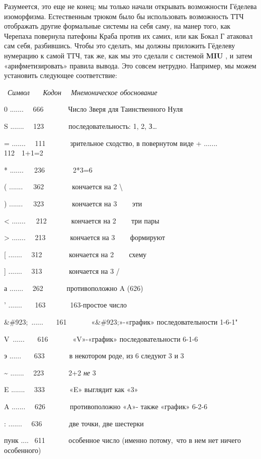 \documentclass[../main.tex]{subfiles}
\begin{document}
Разумеется, это еще не конец; мы только начали открывать возможности Гёделева изоморфизма. Естественным трюком было бы использовать возможность ТТЧ отображать другие формальные системы на себя саму, на манер того, как Черепаха повернула патефоны Краба против их самих, или как Бокал Г атаковал сам себя, разбившись. Чтобы это сделать, мы должны приложить Гёделеву нумерацию к самой ТТЧ, так же, как мы это сделали с системой \textbf{MIU} , и затем «арифметизировать» правила вывода. Это совсем нетрудно. Например, мы можем установить следующее соответствие:

~\emph{Символ~~~ Кодон~~ Мнемоническое обоснование}

0 .......~~ 666~~~~~~~Число Зверя для Таинственного Нуля

S .......~~ 123~~~~~~~последовательность: 1, 2, З\ldots{}

= .......~~ 111~~~~~~~зрительное сходство, в повернутом виде + ....... 112~~1+1=2

* .......~~~236~~~~~~~~2*3=6

( .......~~~362~~~~~~~~кончается на 2 \textbackslash{}

) .......~~~323~~~~~~~~кончается на 3~ \textbar~~ эти

\textless{} .......~~~212~~~~~~~кончается на 2~ \textbar~~ три пары

\textgreater{} .......~~ 213~~~~~~~кончается на 3~ \textbar~~ формируют

{[} .......~~ 312~~~~~~~ кончается на 2~ \textbar~~ схему

{]} .......~~ 313~~~~~~~ кончается на 3 /

а .......~~ 262~~~~~~ противоположно A (626)

' .......~~~ 163~~~~~~~163-простое число

\&\#923;~......~~~ 161~~~~~~~«\&\#923;»-«график» последовательности 1-6-1"

V~......~~~ 616~~~~~~~«V»-«график» последовательности 6-1-6

э ......~~~ 633~~~~~~~в некотором роде, из 6 следуют 3 и 3

\textasciitilde{} .......~~ 223~~~~~~~2+2 \emph{не} 3

E .......~~ 333~~~~~~~«E» выглядит как «3»

A .......~~ 626~~~~~~~противоположно «A»- также «график» 6-2-6

: .......~~ 636~~~~~~~ две точки, две шестерки

пунк ....~ 611~~~~~~ особенное число (именно потому,~что в нем нет ничего особенного)
\end{document}
